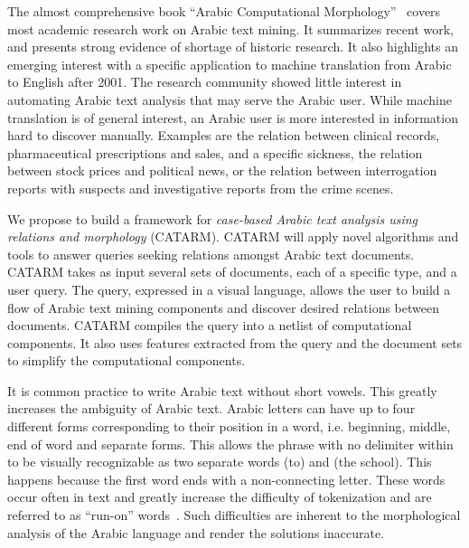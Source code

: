 \documentclass[12pt]{article}
\newcommand{\noTrRL}[1]{\transfalse\RL{#1}\transtrue}
\begin{document}
The almost comprehensive book 
``Arabic Computational Morphology''~\cite{Sou07}
covers most academic research work on Arabic text mining.
It summarizes recent work, and presents strong evidence of 
shortage of historic research. It also highlights  an emerging 
interest with a specific application to machine 
translation from Arabic to English after 2001.
The research community showed little interest in 
automating Arabic text analysis that may serve
the Arabic user.
While machine translation is of general interest, 
an Arabic user is more interested in 
information hard to discover manually.
Examples are the relation between clinical records, pharmaceutical 
prescriptions and sales, and a specific sickness,
the relation
between stock prices and political news, or the 
relation between interrogation reports with suspects
and investigative reports from the crime scenes. 

We propose to build a framework for
{\em case-based Arabic text analysis using relations and morphology} (CATARM). 
CATARM will apply novel algorithms and tools
to answer queries seeking relations amongst
Arabic text documents.
CATARM takes as input several sets of documents, each of a specific
type, and a user query. %
The query, expressed in a visual language, allows the user 
to build a flow of Arabic text mining
components and discover desired relations between documents. 
CATARM compiles the query into a netlist of computational 
components. It also uses features extracted from the query and 
the document sets to simplify the computational 
components. 

\novocalize
It is common practice to write Arabic text
without short vowels. 
This greatly increases the ambiguity of Arabic text. 
Arabic letters can have up to 
four different forms
corresponding to their position in a word, i.e. beginning,
middle, end of word and separate forms. 
This allows the phrase
\noTrRL{il_A\nospace almdrsT}  with no delimiter within
to be visually recognizable
as two separate words  (to) and  (the school).
This happens because the first word  ends with
 a non-connecting letter. 
These words occur often in text and greatly increase the
difficulty of tokenization and are referred to as 
``run-on'' words~\cite{Buckwalter:04}.
Such difficulties are inherent to the 
morphological analysis of the Arabic language and
render the solutions inaccurate.
\end{document}
